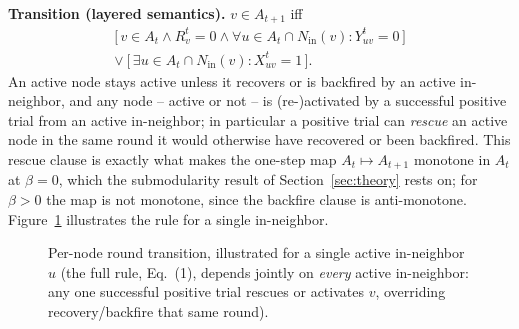 \documentclass[journal]{IEEEtran}
\begin{document}
\textbf{Transition (layered semantics).} $v\in A_{t+1}$ iff
\begin{equation}
\begin{split}
\big[\,v\in A_t \wedge R^t_v=0 \wedge \forall u\in A_t\cap N_{\mathrm{in}}(v): Y^t_{uv}=0\,\big]\\
\vee\ \big[\,\exists u\in A_t\cap N_{\mathrm{in}}(v): X^t_{uv}=1\,\big].
\end{split}
\end{equation}
An active node stays active unless it recovers or is backfired by an active
in-neighbor, and any node -- active or not -- is (re-)activated by a
successful positive trial from an active in-neighbor; in particular a
positive trial can \emph{rescue} an active node in the same round it would
otherwise have recovered or been backfired. This rescue clause is exactly
what makes the one-step map $A_t\mapsto A_{t+1}$ monotone in $A_t$ at
$\beta=0$, which the submodularity result of Section~\ref{sec:theory}
rests on; for $\beta>0$ the map is not monotone, since the backfire clause
is anti-monotone. Figure~\ref{fig:state-transition} illustrates the rule
for a single in-neighbor.

\begin{figure}[t]
\centering
{}
\caption{Per-node round transition, illustrated for a single active
in-neighbor $u$ (the full rule, Eq.~(1), depends jointly on \emph{every}
active in-neighbor: any one successful positive trial rescues or
activates $v$, overriding recovery/backfire that same round).}
\label{fig:state-transition}
\end{figure}
\end{document}

